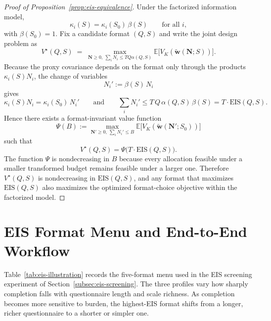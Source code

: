 \documentclass[11pt]{article}
\theoremstyle{definition}
\theoremstyle{remark}
\newcommand{\E}{\mathbb{E}}
\newcommand{\1}{\mathbf{1}}
\newcommand{\w}{\mathbf{w}}
\newcommand{\N}{\mathbf{N}}
\begin{document}
\begin{proof}[Proof of Proposition~\ref{prop:eis-equivalence}]
Under the factorized information model,
\[
\kappa_i(S)=\kappa_i(S_0)\,\beta(S)\qquad\text{for all }i,
\]
with \(\beta(S_0)=1\). Fix a candidate format $(Q,S)$ and write the
joint design problem as
\[
V^\star(Q,S)
\;=\;
\max_{\N\ge 0,\ \sum_i N_i\le TQ\alpha(Q,S)} \E\!\big[V_K(\tilde{\w}(\N;S))\big].
\]
Because the proxy covariance depends on the format only through the
products $\kappa_i(S)N_i$, the change of variables
\[
N_i' := \beta(S)\,N_i
\]
gives
\[
\kappa_i(S)N_i=\kappa_i(S_0)\,N_i'
\qquad\text{and}\qquad
\sum_i N_i' \le T\,Q\,\alpha(Q,S)\,\beta(S)=T\cdot \mathrm{EIS}(Q,S).
\]
Hence there exists a format-invariant value function
\[
\Psi(B)
:=
\max_{\N'\ge 0,\ \sum_i N_i'\le B}
\E\!\big[V_K(\tilde{\w}(\N';S_0))\big]
\]
such that
\[
V^\star(Q,S)=\Psi\!\big(T\cdot \mathrm{EIS}(Q,S)\big).
\]
The function $\Psi$ is nondecreasing in $B$ because every allocation
feasible under a smaller transformed budget remains feasible under a
larger one. Therefore $V^\star(Q,S)$ is nondecreasing in
$\mathrm{EIS}(Q,S)$, and any format that maximizes $\mathrm{EIS}(Q,S)$
also maximizes the optimized format-choice objective within the
factorized model.
\end{proof}

\section{EIS Format Menu and End-to-End Workflow}
\label{app:eis-illustration}

Table~\ref{tab:eis-illustration} records the five-format menu used in
the EIS screening experiment of Section~\ref{subsec:eis-screening}. The
three profiles vary how sharply completion falls with questionnaire
length and scale richness. As completion becomes more sensitive to
burden, the highest-EIS format shifts from a longer, richer questionnaire
to a shorter or simpler one.
\end{document}
